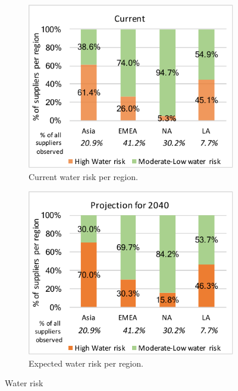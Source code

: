 \documentclass[a4paper]{article}
\begin{document}
\begin{figure}
\centering
\begin{subfigure}[b]{0.45\textwidth}
                \centering
            \includegraphics[width=\textwidth]{plots/water_risk_now_v1.pdf}
  \caption{Current water risk per region.}  \label{fig:water_risk_now}
        \end{subfigure}
\centering      
\begin{subfigure}[b]{0.45\textwidth}                  
       \includegraphics[width=\textwidth]{plots/water_risk_future_v1.pdf}
  \caption{Expected water risk per region.}\label{fig:water_risk_future}
        \end{subfigure}
\caption{Water risk}      
        \label{fig:water_risk}
\end{figure}
\end{document}
